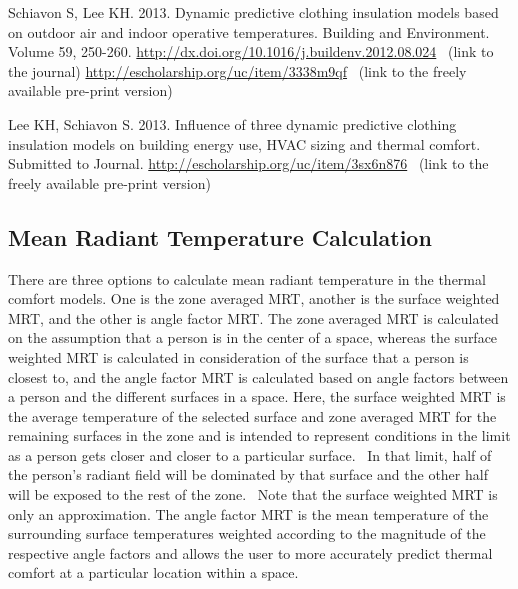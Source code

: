 Schiavon S, Lee KH. 2013. Dynamic predictive clothing insulation models based on outdoor air and indoor operative temperatures. Building and Environment. Volume 59, 250-260. \url{http://dx.doi.org/10.1016/j.buildenv.2012.08.024} ~(link to the journal) \url{http://escholarship.org/uc/item/3338m9qf} ~(link to the freely available pre-print version)

Lee KH, Schiavon S. 2013. Influence of three dynamic predictive clothing insulation models on building energy use, HVAC sizing and thermal comfort. Submitted to Journal. \url{http://escholarship.org/uc/item/3sx6n876}~ (link to the freely available pre-print version)

\subsection{Mean Radiant Temperature Calculation}\label{mean-radiant-temperature-calculation}

There are three options to calculate mean radiant temperature in the thermal comfort models. One is the zone averaged MRT, another is the surface weighted MRT, and the other is angle factor MRT. The zone averaged MRT is calculated on the assumption that a person is in the center of a space, whereas the surface weighted MRT is calculated in consideration of the surface that a person is closest to, and the angle factor MRT is calculated based on angle factors between a person and the different surfaces in a space. Here, the surface weighted MRT is the average temperature of the selected surface and zone averaged MRT for the remaining surfaces in the zone and is intended to represent conditions in the limit as a person gets closer and closer to a particular surface.~ In that limit, half of the person's radiant field will be dominated by that surface and the other half will be exposed to the rest of the zone.~ Note that the surface weighted MRT is only an approximation. The angle factor MRT is the mean temperature of the surrounding surface temperatures weighted according to the magnitude of the respective angle factors and allows the user to more accurately predict thermal comfort at a particular location within a space.

